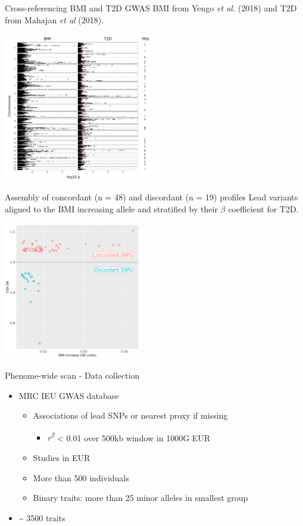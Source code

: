 \documentclass[presentation]{beamer}
\begin{document}
\begin{frame}[label={sec:org176f804}]{Cross-referencing BMI and T2D GWAS}
BMI from Yengo \emph{et al.} (2018) and T2D from Mahajan \emph{et al} (2018).
\begin{center}
\includegraphics[width=6.5cm]{./plots/gmirror.png}
\end{center}
\end{frame}

\begin{frame}[label={sec:org8513618}]{Assembly of concordant (n = 48) and discordant (n = 19) profiles}
Lead variants aligned to the BMI increasing allele and stratified by their \(\beta\) coefficient for T2D.
\begin{center}
\includegraphics[width=6cm]{./plots/profiles.png}
\end{center}
\end{frame}

\begin{frame}[label={sec:orgdaa4ee1}]{Phenome-wide scan - Data collection}
\begin{itemize}
\item MRC IEU GWAS database
\begin{itemize}
\item Associations of lead SNPs or nearest proxy if missing
\begin{itemize}
\item \emph{r\textsuperscript{2}} < 0.01 over 500kb window in 1000G EUR
\end{itemize}
\item Studies in EUR
\item More than 500 individuals
\item Binary traits: more than 25 minor alleles in smallest group
\end{itemize}
\item \textasciitilde{} 3500 traits
\end{itemize}
\end{frame}
\end{document}
